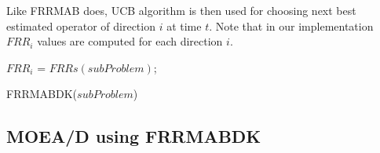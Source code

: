 \documentclass{article}
\begin{document}
    Like FRRMAB does, UCB algorithm is then used for choosing next best estimated operator of direction $i$ at time $t$. Note that in our implementation $FRR_i$ values are computed for each direction $i$.

    \vspace{3mm}

    \begin{algorithm}[H]
        \label{alg:getBestOp}
        \SetAlgoLined

        $FRR_i$ = $FRRs(subProblem)$; \\

        \caption{FRRMABDK($subProblem$)}

    \end{algorithm}


    \subsection{MOEA/D using FRRMABDK}

    \vspace{3mm}
\end{document}
